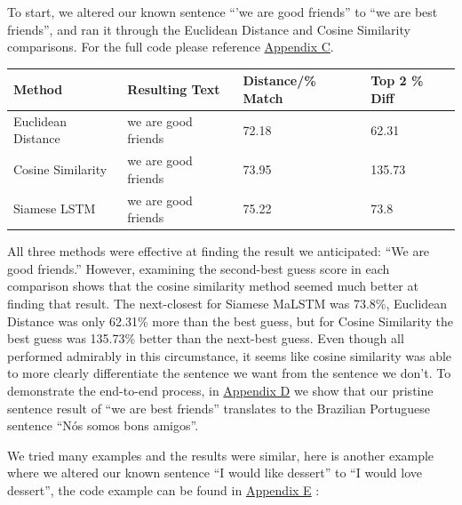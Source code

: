 \documentclass[runningheads]{llncs}
\begin{document}
	To start, we altered our known sentence ``'we are good friends'' to ``we are best friends'', and ran it through the Euclidean Distance and Cosine Similarity comparisons. For the full code please reference \hyperlink{Appendix C}{Appendix C}.

	\begin{table} 
		\begin{center}
			\begin{tabular}{| l | l | l | l |}
			  \hline			
			  Method & Resulting Text & Distance/\% Match & Top 2 \% Diff \\
			  \hline			
			  Euclidean Distance & we are good friends & 72.18 & 62.31 \\
			  \hline			
			  Cosine Similarity & we are good friends & 73.95 & 135.73 \\
			  \hline  
			  Siamese LSTM & we are good friends & 75.22 & 73.8 \\
			  \hline
			\end{tabular}
		\end{center}
		\label{table:``We Are Best Friends'' Match Test}
	\end{table}

	All three methods were effective at finding the result we anticipated: ``We are good friends.'' However, examining the second-best guess score in each comparison shows that the cosine similarity method seemed much better at finding that result. The next-closest for Siamese MaLSTM was 73.8\%, Euclidean Distance was only 62.31\% more than the best guess, but for Cosine Similarity the best guess was 135.73\% better than the next-best guess. Even though all performed admirably in this circumstance, it seems like cosine similarity was able to more clearly differentiate the sentence we want from the sentence we don't.  To demonstrate the end-to-end process, in \hyperlink{Appendix D}{Appendix D} we show that our pristine sentence result of ``we are best friends'' translates to the Brazilian Portuguese sentence ``Nós somos bons amigos''.

	We tried many examples and the results were similar, here is another example where we altered our known sentence ``I would like dessert'' to ``I would love dessert'', the code example can be found in \hyperlink{Appendix E}{Appendix E} :
\end{document}
